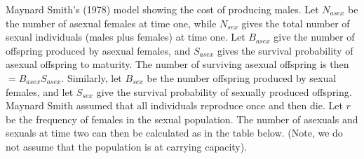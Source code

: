 \documentclass[
  letterpaper,
]{book}
\begin{document}
\begin{tcolorbox}[enhanced jigsaw, toprule=.15mm, rightrule=.15mm, arc=.35mm, titlerule=0mm, breakable, opacityback=0, leftrule=.75mm, bottomtitle=1mm, toptitle=1mm, title=\textcolor{quarto-callout-note-color}{\faInfo}\hspace{0.5em}{Box 1.2}, left=2mm, coltitle=black, colframe=quarto-callout-note-color-frame, colbacktitle=quarto-callout-note-color!10!white, bottomrule=.15mm, opacitybacktitle=0.6, colback=white]

Maynard Smith's (1978) model showing the cost of producing
males.\footnotemark{} Let \(N_{asex}\) be the number of asexual females
at time one, while \(N_{sex}\) gives the total number of sexual
individuals (males plus females) at time one. Let \(B_{asex}\) give the
number of offspring produced by asexual females, and \(S_{asex}\) gives
the survival probability of asexual offspring to maturity. The number of
surviving asexual offspring is then \(= B_{asex}S_{asex}\). Similarly,
let \(B_{sex}\) be the number offspring produced by sexual females, and
let \(S_{sex}\) give the survival probability of sexually produced
offspring. Maynard Smith assumed that all individuals reproduce once and
then die. Let \(r\) be the frequency of females in the sexual
population. The number of asexuals and sexuals at time two can then be
calculated as in the table below. (Note, we do not assume that the
population is at carrying capacity).


\end{tcolorbox}
\end{document}
